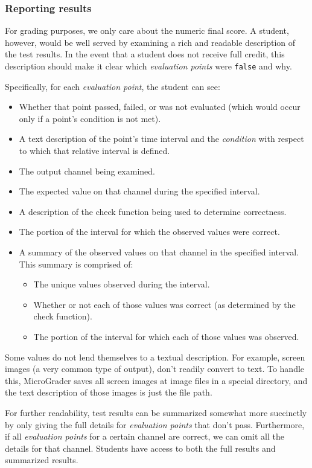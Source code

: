 \documentclass[12pt]{article}
\begin{document}
\subsubsection{Reporting results}
For grading purposes, we only care about the numeric final score.  A student, however, would be well served by examining a rich and readable description of the test results.  In the event that a student does not receive full credit, this description should make it clear which \textit{evaluation points} were \texttt{false} and why.

Specifically, for each \textit{evaluation point}, the student can see:

\begin{itemize}
\item Whether that point passed, failed, or was not evaluated (which would occur only if a point's condition is not met).
\item A text description of the point's time interval and the \textit{condition} with respect to which that relative interval is defined.
\item The output channel being examined.
\item The expected value on that channel during the specified interval.
\item A description of the check function being used to determine correctness.
\item The portion of the interval for which the observed values were correct.
\item A summary of the observed values on that channel in the specified interval.  This summary is comprised of:
\begin{itemize}
\item The unique values observed during the interval.
\item Whether or not each of those values was correct (as determined by the check function).
\item The portion of the interval for which each of those values was observed.
\end{itemize}
\end{itemize}

Some values do not lend themselves to a textual description.  For example, screen images (a very common type of output), don't readily convert to text.  To handle this, MicroGrader saves all screen images at image files in a special directory, and the text description of those images is just the file path.

For further readability, test results can be summarized somewhat more succinctly by only giving the full details for \textit{evaluation points} that don't pass.  Furthermore, if all \textit{evaluation points} for a certain channel are correct, we can omit all the details for that channel.  Students have access to both the full results and summarized results.
\end{document}
